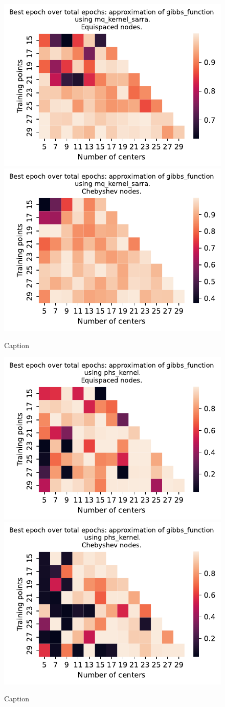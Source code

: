 \documentclass[12pt]{report} %
\begin{document}
\begin{figure}[ht]
    \centering
    
    \includegraphics[width=.49\textwidth]{imagenes/experiments/1d/variational_epochs/gibbs_function-Kmq_kernel_sarra-Equi-epochs.pdf}
    \includegraphics[width=.49\textwidth]{imagenes/experiments/1d/variational_epochs/gibbs_function-Kmq_kernel_sarra-Cheb-epochs.pdf}
    \caption{Caption}
    \label{fig:epochs-gibbs-sarra}
\end{figure}

\begin{figure}[ht]
    \centering
    
    \includegraphics[width=.49\textwidth]{imagenes/experiments/1d/variational_epochs/gibbs_function-Kphs_kernel-Equi-epochs.pdf}
    \includegraphics[width=.49\textwidth]{imagenes/experiments/1d/variational_epochs/gibbs_function-Kphs_kernel-Cheb-epochs.pdf}
    \caption{Caption}
    \label{fig:epochs-gibbs-phs}
\end{figure}
\end{document}

